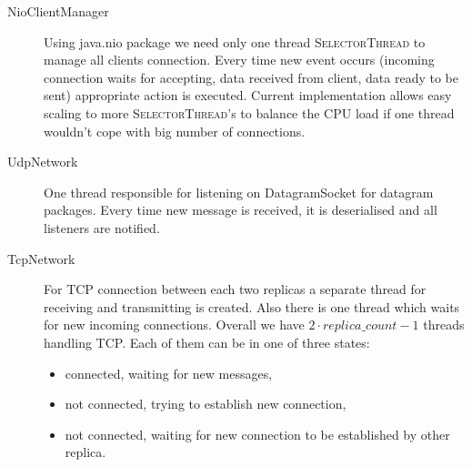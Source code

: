 \begin{description}
	\item[NioClientManager] \hfill

		Using java.nio package we need only one thread \textsc{SelectorThread} to manage all clients connection. Every time new event occurs (incoming connection waits for accepting, data received from client, data ready to be sent) appropriate action is executed. Current implementation allows easy scaling to more \textsc{SelectorThread}'s to balance the CPU load if one thread wouldn't cope with big number of connections.

	\item[UdpNetwork] \hfill

		One thread responsible for listening on DatagramSocket for datagram packages. Every time new message is received, it is deserialised and all listeners are notified. 

	\item[TcpNetwork] \hfill

		For TCP connection between each two replicas a separate thread for receiving and transmitting is created. Also there is one thread which waits for new incoming connections. Overall we have  $2 \cdot replica\_count - 1$ threads handling TCP. Each of them can be in one of three states:
		\begin{itemize}
			\item connected, waiting for new messages,
			\item not connected, trying to establish new connection,
			\item not connected, waiting for new connection to be established by other replica.
		\end{itemize}
\end{description}
